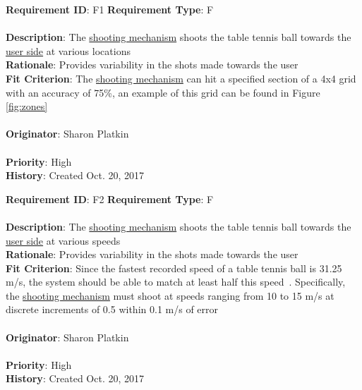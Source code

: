 \documentclass[11pt]{article}
\begin{document}
\begin{framed}
	\noindent\textbf{Requirement ID}: F1 \hfill \textbf{Requirement Type}: F \hfill\\\\
	\noindent\textbf{Description}: The \hyperref[sec:definitions]{shooting mechanism} shoots the table tennis ball towards the \hyperref[sec:definitions]{user side} at various locations \\
	\textbf{Rationale}: Provides variability in the shots made towards the user \\
	\textbf{Fit Criterion}: The \hyperref[sec:definitions]{shooting mechanism} can hit a specified section of a 4x4 grid with an accuracy of 75\%, an example of this grid can be found in Figure \ref{fig:zones}\\\\
	\textbf{Originator}: Sharon Platkin \\\\
	\textbf{Priority}: High \hfill \\
	\noindent\textbf{History}: Created Oct. 20, 2017
\end{framed}

\begin{framed}
	\noindent\textbf{Requirement ID}: F2 \hfill \textbf{Requirement Type}: F \hfill\\\\
	\noindent\textbf{Description}: The \hyperref[sec:definitions]{shooting mechanism} shoots the table tennis ball towards the \hyperref[sec:definitions]{user side} at various speeds \\
	\textbf{Rationale}: Provides variability in the shots made towards the user \\
	\textbf{Fit Criterion}: Since the fastest recorded speed of a table tennis ball is 31.25 m/s, the system should be able to match at least half this speed~\autocite{thoughtco}. Specifically, the \hyperref[sec:definitions]{shooting mechanism} must shoot at speeds ranging from 10 to 15 m/s at discrete increments of 0.5 within 0.1 m/s of error \\\\
	\textbf{Originator}: Sharon Platkin \\\\
	\textbf{Priority}: High \hfill \\
	\noindent\textbf{History}: Created Oct. 20, 2017
\end{framed}
\end{document}
